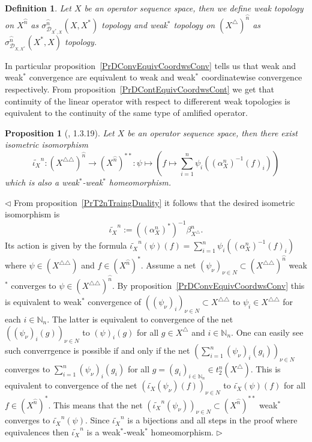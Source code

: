 \documentclass[12pt]{article}
\newtheorem{proposition}[theorem]{Proposition}
\newtheorem{definition}[theorem]{Definition}
\newenvironment{proof}{\par $\triangleleft$}{$\triangleright$}
\begin{document}
\begin{definition}\label{DefWeakConvForSQSp} Let $X$ be an operator sequence 
space, then we define weak topology on $X^{\wideparen{n}}$ as 
$\sigma_{\mathcal{D}_{X^*,X}}^{\wideparen{n}}(X,X^*)$ topology and weak${}^*$ 
topology on ${(X^\triangle)}^{\wideparen{n}}$ as 
$\sigma_{\mathcal{D}_{X,X^*}}^{\wideparen{n}}(X^*,X)$ topology.
\end{definition}

In particular proposition~\ref{PrDConvEquivCoordwsConv} tells us that weak and 
weak${}^*$ convergence are equivalent to weak and weak${}^*$ coordinatewise 
convergence respectively. From proposition~\ref{PrDContEquivCoordwsCont} we get 
that continuity of the linear operator with respect to differerent 
weak topologies is equivalent to the continuity of the same type 
of amlified operator.

\begin{proposition}[\cite{LamOpFolgen}, 1.3.19]\label{PrDoubleDualIsom} 
Let $X$ be an operator sequence space, then there exist isometric isomorphism
$$
\widetilde{\iota_X}^n
:{(X^{\triangle\triangle})}^{\wideparen{n}}\to{(X^{\wideparen{n}})}^{**}
:\psi\mapsto\left(f\mapsto\sum\limits_{i=1}^n
\psi_i({(\alpha_X^n)}^{-1}{(f)}_i)\right)
$$
which is also a weak${}^*$-weak${}^*$ homeomorphism.
\end{proposition}
\begin{proof} From proposition~\ref{PrT2nTraingDuality} it follows that the 
desired isometric isomorphism is 
$$
\widetilde{\iota_X}^n:={({(\alpha_X^n)}^*)}^{-1}\beta_{X^\triangle}^n.
$$ 
Its action is given by the formula 
$\widetilde{\iota_X}^n(\psi)(f)=\sum_{i=1}^n \psi_i({(\alpha_X^n)}^{-1}{(f)}_i)$ 
where $\psi\in (X^{\triangle\triangle})$ and $f\in {(X^{\wideparen{n}})}^*$. 
Assume a net 
${(\psi_\nu)}_{\nu\in N}\subset {(X^{\triangle\triangle})}^{\wideparen{n}}$ 
weak${}^*$ converges to $\psi\in {(X^{\triangle\triangle})}^{\wideparen{n}}$. 
By proposition~\ref{PrDConvEquivCoordwsConv} this is equivalent to weak${}^*$ 
convergence of ${({(\psi_\nu)}_i)}_{\nu\in N}\subset X^{\triangle\triangle}$ to 
$\psi_i\in X^{\triangle\triangle}$ for each $i\in\mathbb{N}_n$. The latter is 
equivalent to convergence of the net ${({(\psi_\nu)}_i(g))}_{\nu\in N}$ to 
${(\psi)}_i(g)$ for all $g\in X^\triangle$ and $i\in\mathbb{N}_n$. 
One can easily see such converrgence is possible  if and only if  the net 
${(\sum_{i=1}^n{(\psi_\nu)}_i(g_i))}_{\nu\in N}$ converges to 
$\sum_{i=1}^n{(\psi_\nu)}_i(g_i)$ for all 
$g={(g_i)}_{i\in\mathbb{N}_n}\in t_2^n(X^\triangle)$. This is equivalent to 
convergence of the net ${(\widetilde{\iota_X}(\psi_\nu)(f))}_{\nu\in N}$ to 
$\widetilde{\iota_X}(\psi)(f)$ for all $f\in {(X^{\wideparen{n}})}^*$. 
This means that the net 
${(\widetilde{\iota_X}^n(\psi_\nu))}_{\nu\in N}
\subset {(X^{\wideparen{n}})}^{**}$ 
weak${}^*$ converges to $\widetilde{\iota_X}^n(\psi)$. Since 
$\widetilde{\iota_X}^n$ is a bijections and all steps in the proof where 
equivalences then $\widetilde{\iota_X}^n$ is a weak${}^*$-weak${}^*$ 
homeomorphism.
\end{proof}
\end{document}
